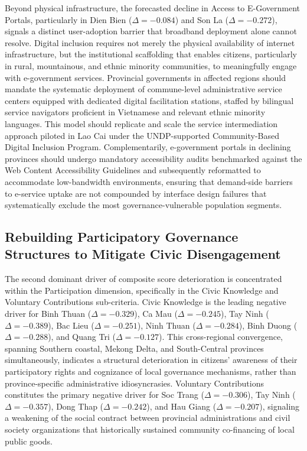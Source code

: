 \documentclass[12pt,a4paper]{article}
\begin{document}
Beyond physical infrastructure, the forecasted decline in Access to E-Government Portals, particularly in Dien Bien ($\Delta = -0.084$) and Son La ($\Delta = -0.272$), signals a distinct user-adoption barrier that broadband deployment alone cannot resolve. Digital inclusion requires not merely the physical availability of internet infrastructure, but the institutional scaffolding that enables citizens, particularly in rural, mountainous, and ethnic minority communities, to meaningfully engage with e-government services. Provincial governments in affected regions should mandate the systematic deployment of commune-level administrative service centers equipped with dedicated digital facilitation stations, staffed by bilingual service navigators proficient in Vietnamese and relevant ethnic minority languages. This model should replicate and scale the service intermediation approach piloted in Lao Cai under the UNDP-supported Community-Based Digital Inclusion Program. Complementarily, e-government portals in declining provinces should undergo mandatory accessibility audits benchmarked against the Web Content Accessibility Guidelines and subsequently reformatted to accommodate low-bandwidth environments, ensuring that demand-side barriers to e-service uptake are not compounded by interface design failures that systematically exclude the most governance-vulnerable population segments.

\subsection{Rebuilding Participatory Governance Structures to Mitigate Civic Disengagement}
\label{subsec:policy_participation}

The second dominant driver of composite score deterioration is concentrated within the Participation dimension, specifically in the Civic Knowledge and Voluntary Contributions sub-criteria. Civic Knowledge is the leading negative driver for Binh Thuan ($\Delta = -0.329$), Ca Mau ($\Delta = -0.245$), Tay Ninh ($\Delta = -0.389$), Bac Lieu ($\Delta = -0.251$), Ninh Thuan ($\Delta = -0.284$), Binh Duong ($\Delta = -0.288$), and Quang Tri ($\Delta = -0.127$). This cross-regional convergence, spanning Southern coastal, Mekong Delta, and South-Central provinces simultaneously, indicates a structural deterioration in citizens' awareness of their participatory rights and cognizance of local governance mechanisms, rather than province-specific administrative idiosyncrasies. Voluntary Contributions constitutes the primary negative driver for Soc Trang ($\Delta = -0.306$), Tay Ninh ($\Delta = -0.357$), Dong Thap ($\Delta = -0.242$), and Hau Giang ($\Delta = -0.207$), signaling a weakening of the social contract between provincial administrations and civil society organizations that historically sustained community co-financing of local public goods.
\end{document}
